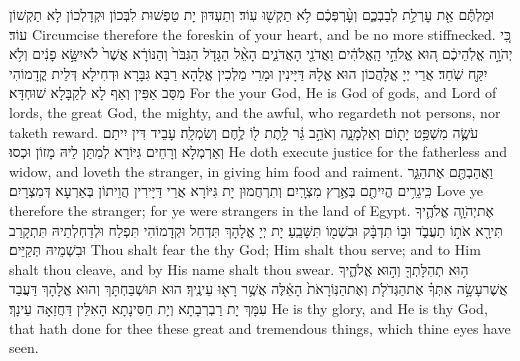 {וּמַלְתֶּ֕ם אֵ֖ת עׇרְלַ֣ת לְבַבְכֶ֑ם וְעׇ֨רְפְּכֶ֔ם לֹ֥א תַקְשׁ֖וּ עֽוֹד׃}
{וְתַעְדּוּן יָת טַפְשׁוּת לִבְּכוֹן וּקְדָלְכוֹן לָא תַקְשׁוֹן עוֹד׃}
{Circumcise therefore the foreskin of your heart, and be no more stiffnecked.}{}
{כִּ֚י יְהֹוָ֣ה אֱלֹֽהֵיכֶ֔ם ה֚וּא אֱלֹהֵ֣י הָֽאֱלֹהִ֔ים וַאֲדֹנֵ֖י הָאֲדֹנִ֑ים הָאֵ֨ל הַגָּדֹ֤ל הַגִּבֹּר֙ וְהַנּוֹרָ֔א אֲשֶׁר֙ לֹא\maqqaf יִשָּׂ֣א פָנִ֔ים וְלֹ֥א יִקַּ֖ח שֹֽׁחַד׃}
{אֲרֵי יְיָ אֱלָהֲכוֹן הוּא אֱלָהּ דַּיָּינִין וּמָרֵי מַלְכִין אֱלָהָא רַבָּא גִּבָּרָא וּדְחִילָא דְּלֵית קֳדָמוֹהִי מִסַּב אַפִּין וְאַף לָא לְקַבָּלָא שׁוּחְדָּא׃}
{For the \lord\space your God, He is God of gods, and Lord of lords, the great God, the mighty, and the awful, who regardeth not persons, nor taketh reward.}{}
{עֹשֶׂ֛ה מִשְׁפַּ֥ט יָת֖וֹם וְאַלְמָנָ֑ה וְאֹהֵ֣ב גֵּ֔ר לָ֥תֶת ל֖וֹ לֶ֥חֶם וְשִׂמְלָֽה׃}
{עָבֵיד דִּין יִיתַם וְאַרְמְלָא וְרָחֵים גִּיּוֹרָא לְמִתַּן לֵיהּ מָזוֹן וּכְסוּ׃}
{He doth execute justice for the fatherless and widow, and loveth the stranger, in giving him food and raiment.}{}
{וַאֲהַבְתֶּ֖ם אֶת\maqqaf הַגֵּ֑ר כִּֽי\maqqaf גֵרִ֥ים הֱיִיתֶ֖ם בְּאֶ֥רֶץ מִצְרָֽיִם׃}
{וְתִרְחֲמוּן יָת גִּיּוֹרָא אֲרֵי דַּיָּירִין הֲוֵיתוֹן בְּאַרְעָא דְּמִצְרָיִם׃}
{Love ye therefore the stranger; for ye were strangers in the land of Egypt.}{}
{אֶת\maqqaf יְהֹוָ֧ה אֱלֹהֶ֛יךָ תִּירָ֖א אֹת֣וֹ תַעֲבֹ֑ד וּב֣וֹ תִדְבָּ֔ק וּבִשְׁמ֖וֹ תִּשָּׁבֵֽעַ׃}
{יָת יְיָ אֱלָהָךְ תִּדְחַל וּקְדָמוֹהִי תִּפְלַח וּלְדַחְלְתֵיהּ תִּתְקָרַב וּבִשְׁמֵיהּ תְּקַיֵּים׃}
{Thou shalt fear the \lord\space thy God; Him shalt thou serve; and to Him shalt thou cleave, and by His name shalt thou swear.}{}
{ה֥וּא תְהִלָּתְךָ֖ וְה֣וּא אֱלֹהֶ֑יךָ אֲשֶׁר\maqqaf עָשָׂ֣ה אִתְּךָ֗ אֶת\maqqaf הַגְּדֹלֹ֤ת וְאֶת\maqqaf הַנּֽוֹרָאֹת֙ הָאֵ֔לֶּה אֲשֶׁ֥ר רָא֖וּ עֵינֶֽיךָ׃}
{הוּא תּוּשְׁבַּחְתָּךְ וְהוּא אֱלָהָךְ דַּעֲבַד עִמָּךְ יָת רַבְרְבָתָא וְיָת חַסִּינָתָא הָאִלֵּין דַּחֲזַאָה עֵינָךְ׃}
{He is thy glory, and He is thy God, that hath done for thee these great and tremendous things, which thine eyes have seen.}{}

